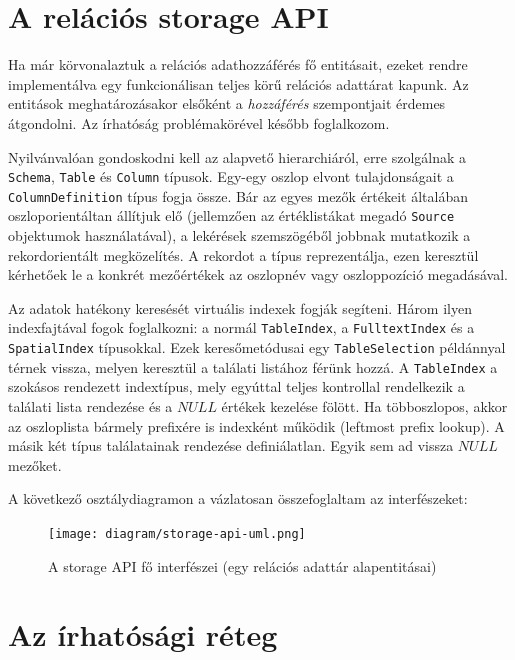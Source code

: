 \documentclass[
    parspace,
    noindent,
    nohyp,
]{elteiktdk}[2023/04/10]
\newcommand{\todoref}[1]{\todo[inline, noinlinepar, color=red, textcolor=white, inlinewidth=0.6cm, caption={#1}]{\large \textbf{×}}}
\begin{document}
\section{A relációs storage API}

Ha már körvonalaztuk a relációs adathozzáférés fő entitásait,
ezeket rendre implementálva egy funkcionálisan teljes körű relációs adattárat kapunk.
Az entitások meghatározásakor elsőként a \textit{hozzáférés} szempontjait érdemes átgondolni.
Az írhatóság problémakörével később foglalkozom.

Nyilvánvalóan gondoskodni kell az alapvető hierarchiáról,
erre szolgálnak a \texttt{Schema}, \texttt{Table} és \texttt{Column} típusok.
Egy-egy oszlop elvont tulajdonságait a \texttt{ColumnDefinition} típus fogja össze.
Bár az egyes mezők értékeit általában oszloporientáltan állítjuk elő
(jellemzően az értéklistákat megadó \texttt{Source} objektumok használatával),
a lekérések szemszögéből jobbnak mutatkozik a rekordorientált megközelítés.
A rekordot a  típus reprezentálja,
ezen keresztül kérhetőek le a konkrét mezőértékek
az oszlopnév vagy oszloppozíció megadásával.

Az adatok hatékony keresését virtuális indexek fogják segíteni.
Három ilyen indexfajtával fogok foglalkozni:
a normál \texttt{TableIndex}, a \texttt{FulltextIndex} és a \texttt{SpatialIndex} típusokkal.
Ezek keresőmetódusai egy \texttt{TableSelection} példánnyal térnek vissza,
melyen keresztül a találati listához férünk hozzá.
A \texttt{TableIndex} a szokásos rendezett indextípus,
mely egyúttal teljes kontrollal rendelkezik a találati lista rendezése
és a $NULL$ értékek kezelése fölött.
Ha többoszlopos, akkor az oszloplista bármely prefixére is indexként működik (leftmost prefix lookup\todoref{Leftmost prefix lookup: valamit róla}).
A másik két típus találatainak rendezése definiálatlan.
Egyik sem ad vissza $NULL$ mezőket.

A következő osztálydiagramon a vázlatosan összefoglaltam az interfészeket:
\todoref{A possibleValues egy Optional<Source>-szel is visszatérhetne}

\begin{figure}[H]
\centering
\texttt{[image: diagram/storage-api-uml.png]}
\caption{A storage API fő interfészei (egy relációs adattár alapentitásai)}
\end{figure}


\section{Az írhatósági réteg}
\end{document}
